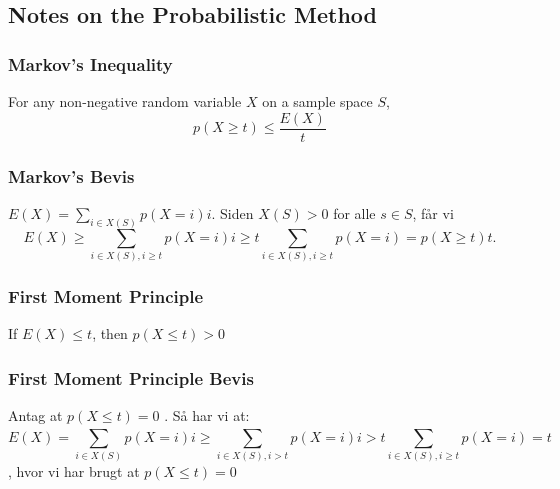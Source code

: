 \documentclass{beamer}
\begin{document}
\subsection{Notes on the Probabilistic Method}
\label{subsec:label}

\begin{frame}
  \frametitle{Markov's Inequality}
  \begin{theorem}
    For any non-negative random variable $X$ on a sample space $S$,
    \begin{equation}
      p(X \geq t) \leq \frac{E(X)}{t}
    \end{equation}
  \end{theorem}
\end{frame}

\begin{frame}
  \frametitle{Markov's Bevis}
  $E(X) = \sum_{i \in X(S)}p(X=i)i$. Siden $X(S) > 0$ for alle $s \in S$, får vi
  \begin{equation}
E(X) \geq \sum_{i \in X(S), i \geq t}p(X=i)i \geq t \sum_{i \in X(S), i \geq t}p(X = i) = p(X \geq t)t.
  \end{equation}
\end{frame}

\begin{frame}
  \frametitle{First Moment Principle}
  \begin{theorem}
If $E(X) \leq t$, then $p(X \leq t) > 0$
  \end{theorem}
\end{frame}

\begin{frame}
  \frametitle{First Moment Principle Bevis}
  Antag at $p(X \leq t) = 0$ . Så har vi at:
  \begin{equation}
E(X) = \sum_{i \in X(S)}^{}p(X=i)i \geq \sum_{i \in X(S), i > t}^{} p(X=i)i > t \sum_{i \in X(S), i \geq t}^{}p (X=i) =t
\end{equation},
hvor vi har brugt at $p(X \leq t) = 0$

\end{frame}
\end{document}
